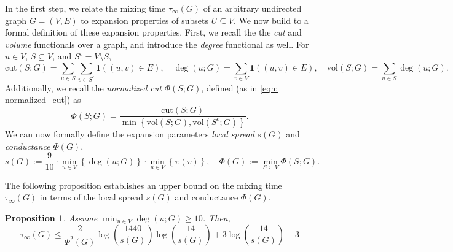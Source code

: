 \documentclass[11pt,twoside]{article}
\newtheorem{proposition}{Proposition}
\newcommand{\set}[1]{\left\{#1\right\}}
\newcommand{\vol}{\mathrm{vol}}
\newcommand{\cut}{\mathrm{cut}}
\newcommand{\1}{\mathbf{1}}
\begin{document}
In the first step, we relate the mixing time $\tau_{\infty}(G)$ of an arbitrary undirected graph $G = (V,E)$ to expansion properties of subsets $U \subseteq V$. We now build to a formal definition of these expansion properties. First, we recall the the \emph{cut} and \emph{volume} functionals over a graph, and introduce the \emph{degree} functional as well. For $u \in V$, $S \subseteq V$, and $S^c = V \setminus S$,
\begin{equation*}
\cut(S;G) = \sum_{u \in S} \sum_{v \in S^c} \1((u,v) \in E), \quad \deg(u;G) = \sum_{v \in V} \1((u,v) \in E), \quad \vol(S;G) = \sum_{u \in S} \deg(u;G).
\end{equation*}
Additionally, we recall the \emph{normalized cut} $\Phi(S;G)$, defined (as in \eqref{eqn: normalized_cut}) as
\begin{equation*}
\Phi(S;G) = \frac{\cut(S; G)}{\min\set{\vol(S; G),\vol(S^c; G)}}.
\end{equation*}
We can now formally define the expansion parameters \emph{local spread} $s(G)$ and \emph{conductance} $\Phi(G)$,
\begin{equation*}
s(G) := \frac{9}{10} \cdot \min_{u \in V} \set{\deg(u; G)} \cdot \min_{u \in V} \set{\pi(v)}, \quad \Phi(G) := \min_{S \subseteq V} \Phi(S;G).
\end{equation*}

The following proposition establishes an upper bound on the mixing time $\tau_{\infty}(G)$ in terms of the local spread $s(G)$ and conductance $\Phi(G)$.
\begin{proposition}
	\label{prop: pointwise_mixing_time}
	Assume $\min_{u \in V} \deg(u; G) \geq 10$. Then,
	\begin{equation*}
	\tau_{\infty}(G) \leq \frac{2}{\Phi^2(G)} \log \left(\frac{1440}{s(G)}\right)\log \left(\frac{14}{s(G)}\right)  + 3 \log \left(\frac{14}{s(G)}\right) + 3
	\end{equation*}
\end{proposition}
\end{document}
